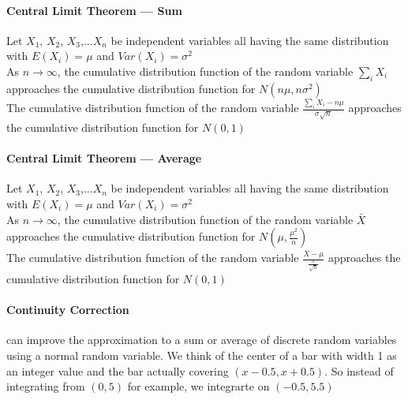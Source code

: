     \paragraph{Central Limit Theorem --- Sum} Let $X_1$, $X_2$, $X_3$,...$X_n$
    be independent variables all having the same distribution with $E(X_i) =
    \mu$ and $Var(X_i) = \sigma^2$\\
    As $n \rightarrow \infty$, the cumulative distribution function of the
    random variable $\sum_i X_i$ approaches the cumulative distribution
    function for $N(n\mu, n\sigma^2)$\\
    The cumulative distribution function of the random variable $\frac{\sum_i
    X_i - n\mu}{\sigma \sqrt{n}}$ approaches the cumulative distribution
    function for $N(0, 1)$


    \paragraph{Central Limit Theorem --- Average} Let $X_1$, $X_2$, $X_3$,...$X_n$
    be independent variables all having the same distribution with $E(X_i) =
    \mu$ and $Var(X_i) = \sigma^2$\\
    As $n \rightarrow \infty$, the cumulative distribution function of the
    random variable $\bar{X}$ approaches the cumulative distribution
    function for $N(\mu, \frac{\mu^2}{n})$\\
    The cumulative distribution function of the random variable $\frac{\bar{X} -
    \mu} {\frac{\sigma}{\sqrt{n}}}$ approaches the cumulative distribution
    function for $N(0, 1)$

    \paragraph{Continuity Correction} can improve the approximation to a sum or
    average of discrete random variables using a normal random variable. We
    think of the center of a bar with width 1 as an integer value and the bar
    actually covering $(x - 0.5, x + 0.5)$. So instead of integrating from $(0,
    5)$ for example, we integrarte on $(-0.5, 5.5)$

